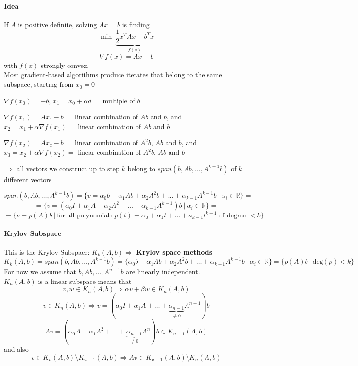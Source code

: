 \documentclass[10pt]{report}
\begin{document}
\paragraph{Idea} If $A$ is positive definite, solving $Ax=b$ is finding $$\min\:\underset{f(x)}{\underbrace{\frac{1}{2}x^TAx - b^Tx}}$$ $$\nabla f(x) = Ax-b$$ with $f(x)$ strongly convex. \\
Most gradient-based algorithms produce iterates that belong to the same subspace, starting from $x_0 = 0$\begin{list}{}{}
	\item $\nabla f(x_0) = -b$, $x_1 = x_0+\alpha d=$ multiple of $b$
	\item $\nabla f(x_1) = Ax_1-b=$ linear combination of $Ab$ and $b$, and $x_2=x_1+\alpha\nabla f(x_1) =$ linear combination of $Ab$ and $b$
	\item $\nabla f(x_2) = Ax_2-b=$ linear combination of $A^2b$, $Ab$ and $b$, and $x_3=x_2+\alpha\nabla f(x_2) =$ linear combination of $A^2b$, $Ab$ and $b$
	\item[$\Rightarrow$] all vectors we construct up to step $k$ belong to $span(b,Ab,\ldots,A^{k-1}b)$ of $k$ different vectors
\end{list}
$$span(b,Ab,\ldots,A^{k-1}b) = \{v=\alpha_0b+\alpha_1Ab+\alpha_2A^2b+\ldots+\alpha_{k-1}A^{k-1}b\:|\:\alpha_i\in \mathbb{R}\}=$$
$$=\{v = (\alpha_0I+\alpha_1A+\alpha_2A^2+\ldots+\alpha_{k-1}A^{k-1})b\:|\:\alpha_i\in \mathbb{R}\} = $$
$$ = \{v=p(A)b\:|\:\text{for all polynomials }p(t)=\alpha_0+\alpha_1t+\ldots+a_{k-1}t^{k-1}\text{ of degree }<k\}$$

\paragraph{Krylov Subspace} This is the Krylov Subspace: $K_k(A,b)\Rightarrow$ \textbf{Krylov space methods}
$$K_k(A,b) = span(b,Ab,\ldots,A^{k-1}b) = \{\alpha_0b+\alpha_1Ab+\alpha_2A^2b+\ldots+\alpha_{k-1}A^{k-1}b\:|\:\alpha_i\in \mathbb{R}\} = \{p(A)b\:|\:\text{deg}(p)<k\}$$
For now we assume that $b, Ab, \ldots, A^{n-1}b$ are linearly independent.\\
$K_n(A,b)$ is a linear subspace means that $$v,w\in K_n(A,b)\Rightarrow \alpha v+\beta w\in K_n(A,b)$$
$$v\in K_n(A,b)\Rightarrow v=(\alpha_0 I + \alpha_1 A + \ldots + \underset{\neq 0}{\underbrace{\alpha_{n-1}}} A^{n-1})b$$ $$Av = (\alpha_0A + \alpha_1 A^2+\ldots + \underset{\neq 0}{\underbrace{\alpha_{n-1}}} A^n)b \in K_{n+1}(A,b)$$ and also $$v\in K_n(A,b) \setminus K_{n-1}(A,b)\Rightarrow Av \in K_{n+1}(A,b)\setminus K_n(A,b)$$
\end{document}
